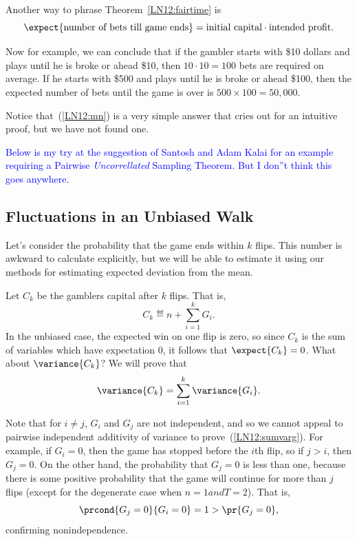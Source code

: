 \begin{editingnotes}
Another way to phrase Theorem~\ref{LN12:fairtime} is
\begin{equation}\label{LN12:mn}
\expect{\text{number of bets till game ends}} = \text{initial capital}
\cdot \text{intended profit}.
\end{equation}

Now for example, we can conclude that if the gambler starts with \$10
dollars and plays until he is broke or ahead \$10, then $10 \cdot 10 = 100$
bets are required on average.  If he starts with \$500 and plays until he
is broke or ahead \$100, then the expected number of bets until the game is
over is $500 \times 100 = 50,000$.

Notice that~(\ref{LN12:mn}) is a very simple answer that cries out for an
intuitive proof, but we have not found one.

\end{editingnotes}

\iffalse

\textcolor{blue}{Below is my try at the suggestion of Santosh and Adam
  Kalai for an example requiring a Pairwise \emph{Uncorrellated}
  Sampling Theorem.  But I don''t think this goes anywhere.}

\subsection{Fluctuations in an Unbiased Walk}

Let's consider the probability that the game ends within $k$ flips.  This
number is awkward to calculate explicitly, but we will be able to estimate
it using our methods for estimating expected deviation from the mean.

Let $C_k$ be the gamblers capital after $k$ flips.  That is,
\[
C_k \eqdef n + \sum_{i=1}^k G_i.
\]
In the unbiased case, the expected win on one flip is zero, so since $C_k$
is the sum of variables which have expectation 0, it follows that
$\expect{C_k} = 0$.  What about $\variance{C_k}$?  We will prove that
\begin{equation}\label{LN12:sumvarg}
\variance{C_k} = \sum_{i=1}^k \variance{G_i}.
\end{equation}

Note that for $i \neq j$, $G_i$ and $G_j$ are not independent, and so we
cannot appeal to pairwise independent additivity of variance to
prove~(\ref{LN12:sumvarg}).  For example, if $G_i = 0$, then the game has
stopped before the $i$th flip, so if $j > i$, then $G_j = 0$.  On the
other hand, the probability that $G_j = 0$ is less than one, because there
is some positive probability that the game will continue for more than $j$
flips (except for the degenerate case when $n=1 and T=2$).  That is,
\[
\prcond{G_j = 0}{G_i = 0} = 1 > \pr{G_j = 0},
\]
confirming nonindependence.

